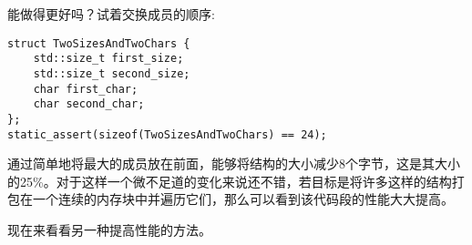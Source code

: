 能做得更好吗？试着交换成员的顺序:

\begin{lstlisting}[style=styleCXX]
struct TwoSizesAndTwoChars {
	std::size_t first_size;
	std::size_t second_size;
	char first_char;
	char second_char;
};
static_assert(sizeof(TwoSizesAndTwoChars) == 24);
\end{lstlisting}

通过简单地将最大的成员放在前面，能够将结构的大小减少8个字节，这是其大小的25\%。对于这样一个微不足道的变化来说还不错，若目标是将许多这样的结构打包在一个连续的内存块中并遍历它们，那么可以看到该代码段的性能大大提高。

现在来看看另一种提高性能的方法。















